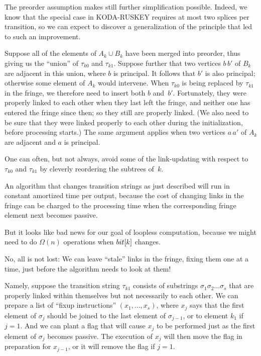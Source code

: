 \fi

The preorder assumption makes still further simplification possible.
Indeed, we know that the special case in {\mc KODA-RUSKEY} requires
at most two splices per transition, so we can expect to discover
a generalization of the principle that led to such an improvement.

Suppose all of the elements of $A_k\cup B_k$ have been merged into
preorder, thus giving us the ``union'' of $\tau_{k0}$ and $\tau_{k1}$.
Suppose further that two vertices $b\,b'$ of $B_k$ are adjacent in
this union, where $b$ is principal. It follows that $b'$ is also
principal; otherwise some element of $A_k$ would intervene.
When $\tau_{k0}$ is being replaced by $\tau_{k1}$ in the fringe,
we therefore need to insert both $b$ and~$b'$. Fortunately, they were
properly linked to each other when they last left the fringe,
and neither one has entered the fringe since then; so they still are
properly linked. (We also need to be sure that they were linked properly
to each other during the initialization, before processing starts.)
The same argument applies when two vertices $a\,a'$ of $A_k$ are
adjacent and $a$ is principal.

One can often, but not always,
avoid some of the link-updating with respect to $\tau_{k0}$ and
$\tau_{k1}$ by cleverly reordering the subtrees of~$k$.

\fi

An algorithm that changes transition strings as just described will run
in constant amortized time per output, because the cost of changing
links in the fringe can be charged to the processing time when the
corresponding fringe element next becomes passive.

But it looks like bad news for our goal of loopless computation,
because we might need to do $\Omega(n)$ operations when $\\{bit}[k]$ changes.

No, all is not lost: We can leave ``stale'' links in the fringe,
fixing them one at a time, just before the algorithm needs to look at them!

Namely, suppose the transition string $\tau_{k1}$ consists of substrings
$\sigma_1\sigma_2\ldots\sigma_s$ that are properly linked within themselves
but not necessarily to each other. We can prepare a list of ``fixup
instructions'' $(x_1,\ldots,x_s)$, where $x_j$ says that the first element
of $\sigma_j$ should be joined to the last element of $\sigma_{j-1}$, or
to element $k_1$ if $j=1$. And we can plant a flag that will cause $x_j$ to
be performed just as the first element of $\sigma_j$ becomes passive.
The execution of $x_j$ will then move the flag in preparation for $x_{j-1}$,
or it will remove the flag if $j=1$.

